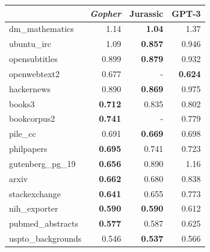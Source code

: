 \documentclass[11pt, a4paper, logo, internal, copyright, nonumbering]{deepmind}
\newcommand{\gopher}{\textit{Gopher}\xspace}
\begin{document}
\begin{table}[t]
\begin{center}
\begin{tabular}{lrrr}
\toprule
{} &    \gopher &  Jurassic &     GPT-3 \\
\midrule
dm\_mathematics    &  1.14 &  \textbf{1.04} &  1.37 \\
ubuntu\_irc        &  1.09 &  \textbf{0.857} &  0.946 \\
opensubtitles     &  0.899 &  \textbf{0.879} &  0.932 \\
openwebtext2     &  0.677 &  - &  \textbf{0.624} \\
hackernews        &  0.890 &  \textbf{0.869} &  0.975 \\
books3            &  \textbf{0.712} &  0.835 &  0.802 \\
bookcorpus2            &  \textbf{0.741} &  -  &  0.779 \\
pile\_cc           &  0.691 & \textbf{0.669} &  0.698 \\
philpapers        &  \textbf{0.695} &  0.741 &  0.723 \\
gutenberg\_pg\_19   &  \textbf{0.656} &  0.890 &  1.16 \\
arxiv             &  \textbf{0.662} &  0.680 &  0.838 \\
stackexchange     &  \textbf{0.641} &  0.655 &  0.773 \\
nih\_exporter      &  \textbf{0.590} &  \textbf{0.590} &  0.612 \\
pubmed\_abstracts  &  \textbf{0.577} &  0.587 &  0.625 \\
uspto\_backgrounds &  0.546 &  \textbf{0.537} &  0.566 \\

\end{tabular}
\end{center}
\end{table}
\end{document}
